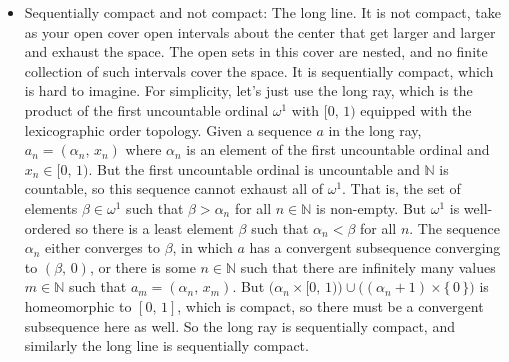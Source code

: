 \documentclass{article}
\theoremstyle{plain}
\theoremstyle{normal}
\begin{document}
\begin{itemize}
                soon. It is not sequentially compact. The product is
                uncountable so the space is not first countable, and intuitively
                sequences are enough to describe the space.
            \item Sequentially compact and not compact: The long line. It is not
                compact, take as your open cover open intervals about the
                center that get larger and larger and exhaust the space. The
                open sets in this cover are nested, and no finite collection of
                such intervals cover the space. It is sequentially compact,
                which is hard to imagine. For simplicity, let's just use the
                long ray, which is the product of the first uncountable
                ordinal $\omega^{1}$ with $[0,\,1)$ equipped with the
                lexicographic order topology. Given a sequence $a$ in the long
                ray, $a_{n}=(\alpha_{n},\,x_{n})$ where $\alpha_{n}$ is an
                element of the first uncountable ordinal and $x_{n}\in[0,\,1)$.
                But the first uncountable ordinal is uncountable and
                $\mathbb{N}$ is countable, so this sequence cannot exhaust all
                of $\omega^{1}$. That is, the set of elements
                $\beta\in\omega^{1}$ such that $\beta>\alpha_{n}$ for all
                $n\in\mathbb{N}$ is non-empty. But $\omega^{1}$ is well-ordered
                so there is a least element $\beta$ such that
                $\alpha_{n}<\beta$ for all $n$. The sequence $\alpha_{n}$
                either converges to $\beta$, in which $a$ has a convergent
                subsequence converging to $(\beta,\,0)$, or there is some
                $n\in\mathbb{N}$ such that there are infinitely many values
                $m\in\mathbb{N}$ such that $a_{m}=(\alpha_{n},\,x_{m})$.
                But $\big(\alpha_{n}\times[0,\,1)\big)\cup\big((\alpha_{n}+1)\times\{\,0\,\}\big)$
                is homeomorphic to $[0,\,1]$, which is compact, so there must be
                a convergent subsequence here as well. So the long ray is
                sequentially compact, and similarly the long line is
                sequentially compact.
        \end{itemize}
\end{document}
